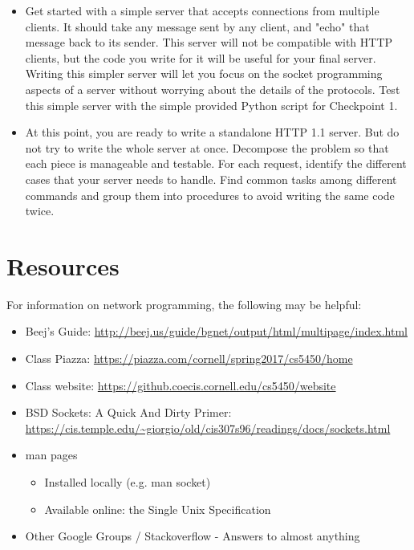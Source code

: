 \documentclass[12pt]{article}
\begin{document}
\begin{itemize}
\item Get started with a simple server that accepts connections from
multiple clients. It should take any message sent by any client,
and "echo" that message back to its sender. This server will not be
compatible with HTTP clients, but the code you write for it will be
useful for your final server. Writing this simpler server will let you
focus on the socket programming aspects of a server without worrying
about the details of the protocols. Test this simple server with the
simple provided Python script for Checkpoint 1.

\item At this point, you are ready to write a standalone HTTP 1.1
server. But do not try to write the whole server at once. Decompose the
problem so that each piece is manageable and testable. For each request,
identify the different cases that your server needs to handle. Find
common tasks among different commands and group them into procedures to
avoid writing the same code twice.

\end{itemize}

\section{Resources}

For information on network programming, the following may be helpful:
\begin{itemize}


 \item Beej’s Guide: \url{http://beej.us/guide/bgnet/output/html/multipage/index.html}
 \item  Class Piazza: \url{https://piazza.com/cornell/spring2017/cs5450/home}
\item  Class website: \url{https://github.coecis.cornell.edu/cs5450/website}
\item  BSD Sockets: A Quick And Dirty Primer: \\
\url{https://cis.temple.edu/~giorgio/old/cis307s96/readings/docs/sockets.html}

\item  man pages
\begin{itemize}
\item  Installed locally (e.g. man socket)
\item Available online: the Single Unix Specification
\end{itemize}
\item  Other Google Groups / Stackoverflow - Answers to almost anything
\end{itemize}

% 
% 
\end{document}
